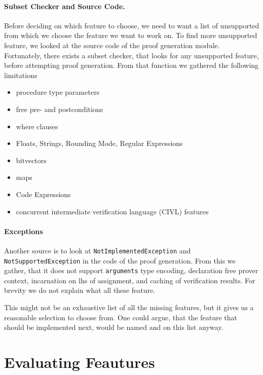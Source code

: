 \paragraph{Subset Checker and Source Code.} Before deciding on which feature to choose,
we need to want a list of unsupported from which we choose the feature we want to work on.
To find more unsupported feature, we looked at the source code of the proof generation module.
Fortunately, there exists a subset checker, that looks for any unsupported feature,
before attempting proof generation.
From that function we gathered the following limitations
\begin{itemize}
  \item procedure type parameters
  \item free pre- and postconditions
  \item where clauses
  \item Floats, Strings, Rounding Mode, Regular Expressions
  \item bitvectors
  \item maps
  \item Code Expressions
  \item concurrent intermediate verification language (CIVL) features
\end{itemize}

\paragraph{Exceptions} Another source is to look at
\lstinline[columns=fixed]{NotImplementedException} and
\lstinline[columns=fixed]{NotSupportedException}
in the code of the proof generation.
From this we gather, that it does not support \lstinline[columns=fixed]{arguments} type encoding,
declaration free prover context, incarnation on lhs of assignment, and caching of verification results. For brevity we do not explain what all these feature.

This might not be an exhaustive list of all the missing features,
but it gives us a reasonable selection to choose from.
One could argue, that the feature that should be implemented next, would be named and on this list anyway.


\section{Evaluating Feautures}

